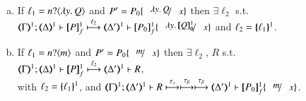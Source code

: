 \documentclass[runningheads]{llncs}
\begin{document}
{\begin{proposition}
\begin{enumerate}[1.]
\begin{enumerate}[a)]
				\item
					If $\ell_1 = n ? \langle \lambda y.\,Q \rangle$ and
					$P' = P_0 \subst{\abs{y}Q}{x}$
					then $\exists \ell_2$ s.t. \\
					$\horel{\tmap{\Gamma}{1}}{\tmap{\Delta}{1}}{\pmapp{P}{1}{f}}{\hby{\ell_2}}{\tmap{\Delta'}{1}}{\pmapp{P_0}{1}{f}\subst{\abs{y}\pmapp{Q}{1}{\emptyset}}{x}}$
					and $\ell_2 = \{\!\!\{\ell_1\}\!\!\}^{1}$.
			
				\item
					If $\ell_1 = n ? \langle m \rangle$
					and 
					$P' = P_0 \subst{m}{x}$
					then $\exists \ell_2$, $R$ s.t. 
					$\horel{\tmap{\Gamma}{1}}{\tmap{\Delta}{1}}{\pmapp{P}{1}{f}}{\hby{\ell_2}}{\tmap{\Delta'}{1}}{R}$, \\
					with $\ell_2 = \{\!\!\{\ell_1\}\!\!\}^{1}$, 
					and
					$\horel{\tmap{\Gamma}{1}}{\tmap{\Delta'}{1}}{R}{\hby{\stau} \hby{\btau} \hby{\btau}}
					{\tmap{\Delta'}{1}}{\pmapp{P_0}{1}{f}\subst{m}{x}}$.
						
%			
%			
			\end{enumerate}
			

\end{enumerate}
\end{proposition}}
\end{document}
